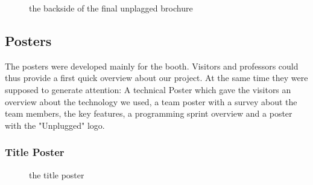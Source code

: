 \begin{figure}[!hbtp]
  \centering
  \caption{the backside of the final unplagged brochure}
  \label{fig:brochure_final_backside}
\end{figure}

\pagebreak 

\subsection{Posters}

The posters were developed mainly for the booth. Visitors and professors could thus provide a first quick overview about our project. At the same time they were supposed to generate attention: 
A technical Poster which gave the visitors an overview about the technology we used, 
a team poster with a survey about the team members, the key features, a programming sprint overview and a poster with the "Unplugged" logo.


\subsubsection{Title Poster}

\begin{figure}[!hbtp]
  \centering
  \caption{the title poster}
  \label{fig:poster_title}
\end{figure}

